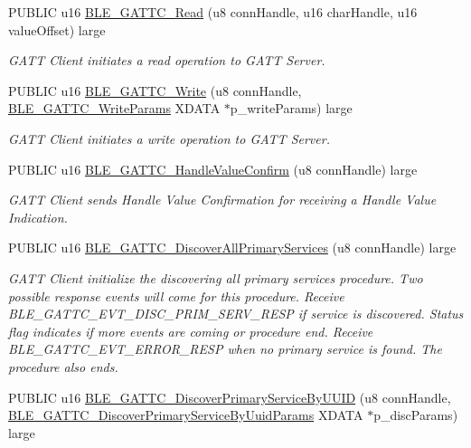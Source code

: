 \begin{DoxyCompactItemize}
P\+U\+B\+L\+IC u16 \hyperlink{group___b_l_e___g_a_t_t_gaf93e988e8f26bb9df716c8d913d2ea7b}{B\+L\+E\+\_\+\+G\+A\+T\+T\+C\+\_\+\+Read} (u8 conn\+Handle, u16 char\+Handle, u16 value\+Offset) large
\begin{DoxyCompactList}\small\item\em G\+A\+TT Client initiates a read operation to G\+A\+TT Server. \end{DoxyCompactList}\item 
P\+U\+B\+L\+IC u16 \hyperlink{group___b_l_e___g_a_t_t_ga822208018904290ec8f5de3c5644f1c1}{B\+L\+E\+\_\+\+G\+A\+T\+T\+C\+\_\+\+Write} (u8 conn\+Handle, \hyperlink{struct_b_l_e___g_a_t_t_c___write_params}{B\+L\+E\+\_\+\+G\+A\+T\+T\+C\+\_\+\+Write\+Params} X\+D\+A\+TA $\ast$p\+\_\+write\+Params) large
\begin{DoxyCompactList}\small\item\em G\+A\+TT Client initiates a write operation to G\+A\+TT Server. \end{DoxyCompactList}\item 
P\+U\+B\+L\+IC u16 \hyperlink{group___b_l_e___g_a_t_t_ga8cf4f7194f7d87e193cc9a002b39eb49}{B\+L\+E\+\_\+\+G\+A\+T\+T\+C\+\_\+\+Handle\+Value\+Confirm} (u8 conn\+Handle) large
\begin{DoxyCompactList}\small\item\em G\+A\+TT Client sends Handle Value Confirmation for receiving a Handle Value Indication. \end{DoxyCompactList}\item 
P\+U\+B\+L\+IC u16 \hyperlink{group___b_l_e___g_a_t_t_ga99da90abd398559e06a91dec0555ac35}{B\+L\+E\+\_\+\+G\+A\+T\+T\+C\+\_\+\+Discover\+All\+Primary\+Services} (u8 conn\+Handle) large
\begin{DoxyCompactList}\small\item\em G\+A\+TT Client initialize the discovering all primary services procedure. Two possible response events will come for this procedure. Receive B\+L\+E\+\_\+\+G\+A\+T\+T\+C\+\_\+\+E\+V\+T\+\_\+\+D\+I\+S\+C\+\_\+\+P\+R\+I\+M\+\_\+\+S\+E\+R\+V\+\_\+\+R\+E\+SP if service is discovered. Status flag indicates if more events are coming or procedure end. Receive B\+L\+E\+\_\+\+G\+A\+T\+T\+C\+\_\+\+E\+V\+T\+\_\+\+E\+R\+R\+O\+R\+\_\+\+R\+E\+SP when no primary service is found. The procedure also ends. \end{DoxyCompactList}\item 
P\+U\+B\+L\+IC u16 \hyperlink{group___b_l_e___g_a_t_t_ga1971ff8cbddce2f2bebfd984ef0a6005}{B\+L\+E\+\_\+\+G\+A\+T\+T\+C\+\_\+\+Discover\+Primary\+Service\+By\+U\+U\+ID} (u8 conn\+Handle, \hyperlink{struct_b_l_e___g_a_t_t_c___discover_primary_service_by_uuid_params}{B\+L\+E\+\_\+\+G\+A\+T\+T\+C\+\_\+\+Discover\+Primary\+Service\+By\+Uuid\+Params} X\+D\+A\+TA $\ast$p\+\_\+disc\+Params) large

\end{DoxyCompactItemize}
